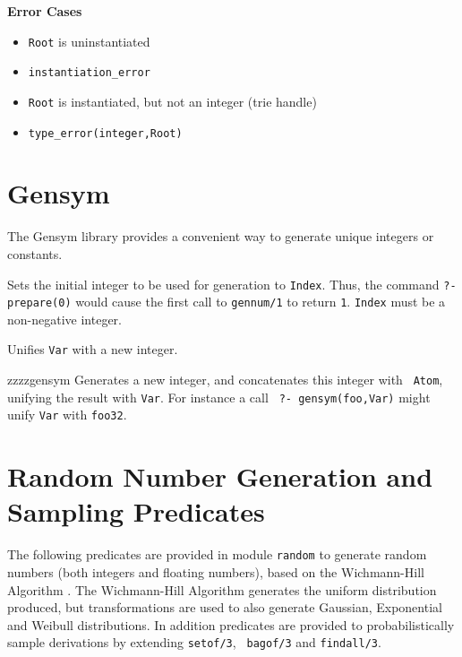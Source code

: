 {\begin{description}
{\bf Error Cases}
\begin{itemize}
\item 	{\tt Root} is uninstantiated
\bi
\item 	 {\tt instantiation\_error}
\ei
\item 	{\tt Root} is instantiated, but not an integer (trie handle)
\bi
\item 	 {\tt type\_error(integer,Root)}
\ei
\end{itemize}


\end{description}
}
\section{Gensym}

The Gensym library provides a convenient way to generate unique
integers or constants.  

\begin{description}
%
Sets the initial integer to be used for generation to {\tt Index}.
Thus, the command {\tt ?- prepare(0)} would cause the first call to
{\tt gennum/1} to return {\tt 1}.  {\tt Index} must be a non-negative
integer.

%
Unifies {\tt Var} with a new integer.

zzzz{gensym} 
%
Generates a new integer, and concatenates this integer with {\tt
Atom}, unifying the result with {\tt Var}.  For instance a call {\tt
?- gensym(foo,Var)} might unify {\tt Var} with {\tt foo32}.
\end{description}

\section{Random Number Generation and Sampling Predicates}

The following predicates are provided in module \texttt{random} to
generate random numbers (both integers and floating numbers), based on
the Wichmann-Hill Algorithm \cite{WicH82,McLe85}.  The Wichmann-Hill
Algorithm generates the uniform distribution produced, but
transformations are used to also generate Gaussian, Exponential and
Weibull distributions.  In addition predicates are provided to
probabilistically sample derivations by extending {\tt setof/3}, {\tt
  bagof/3} and {\tt findall/3}.

